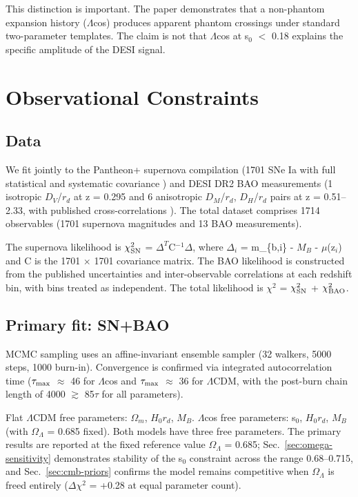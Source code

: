 This distinction is important. The paper demonstrates that a non-phantom
expansion history ($\Lambda$cos) produces apparent phantom crossings under
standard two-parameter templates. The claim is not that $\Lambda$cos at s$_0$
$<$ 0.18 explains the specific amplitude of the DESI signal.

\section{Observational Constraints}\label{sec:obs-constraints}

\subsection{Data}\label{sec:data}

We fit jointly to the Pantheon+ supernova compilation (1701 SNe Ia with
full statistical and systematic covariance \cite{ref2}) and DESI DR2 BAO
measurements (1 isotropic $D_V$/$r_d$ at z = 0.295 and 6 anisotropic
$D_M$/$r_d$, $D_H$/$r_d$ pairs at z = 0.51--2.33, with published
cross-correlations \cite{ref1}). The total dataset comprises 1714
observables (1701 supernova magnitudes and 13 BAO measurements).

The supernova likelihood is $\chi^2_{\rm SN}$ = $\Delta^T$C$^{-1}\Delta$, where $\Delta_i$ = m\_\{b,i\} -
$M_B$ - $\mu$(z$_i$) and C is the 1701 $\times$ 1701 covariance matrix. The BAO
likelihood is constructed from the published uncertainties and
inter-observable correlations at each redshift bin, with bins treated as
independent. The total likelihood is $\chi^2$ = $\chi^2_{\rm SN}$ + $\chi^2_{\rm BAO}$.

\subsection{Primary fit: SN+BAO}\label{sec:primary-fit}

MCMC sampling uses an affine-invariant ensemble sampler (32 walkers,
5000 steps, 1000 burn-in). Convergence is confirmed via integrated
autocorrelation time ($\tau_{\rm max}$ $\approx$ 46 for $\Lambda$cos and $\tau_{\rm max}$ $\approx$ 36 for $\Lambda$CDM,
with the post-burn chain length of 4000 $\gtrsim$ 85$\tau$ for all parameters).

Flat $\Lambda$CDM free parameters: $\Omega_m$, $H_0 r_d$, $M_B$. $\Lambda$cos free parameters: s$_0$,
$H_0 r_d$, $M_B$ (with $\Omega_\Lambda$ = 0.685 fixed). Both models have three free
parameters. The primary results are reported at the fixed reference
value $\Omega_\Lambda$ = 0.685; Sec.~\ref{sec:omega-sensitivity} demonstrates stability of the s$_0$ constraint
across the range 0.68--0.715, and Sec.~\ref{sec:cmb-priors} confirms the model remains
competitive when $\Omega_\Lambda$ is freed entirely ($\Delta\chi^2$ = +0.28 at equal parameter
count).

